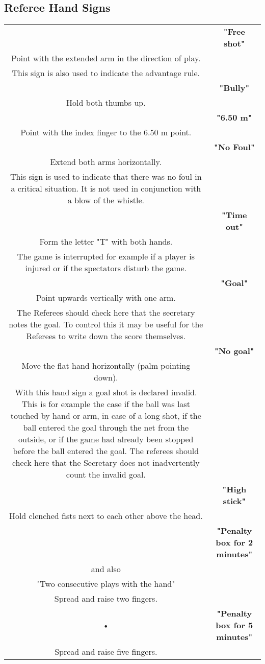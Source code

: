 \subsection{Referee Hand Signs}
\begin{tabular}{|c|c|}
\hline 
 & \textbf{"Free shot"}\\ Point with the extended arm in the direction of play.\\ This sign is also used to indicate the advantage rule. \\ 
\hline 
 & \textbf{"Bully"}\\ Hold both thumbs up. \\ 
\hline 
 & \textbf{"6.50 m"}\\ Point with the index finger to the 6.50 m point. \\ 
\hline 
 & \textbf{"No Foul"}\\Extend both arms horizontally.\\This sign is used to indicate that there was no foul in a critical situation. It is not used in conjunction with a blow of the whistle. \\ 
\hline 
& \textbf{"Time out"}\\Form the letter "T" with both hands.\\The game is interrupted for example if a player is injured or if the spectators disturb the game. \\ 
\hline 
 & \textbf{"Goal"}\\Point upwards vertically with one arm.\\The Referees should check here that the secretary notes the goal. To control this it may be useful for the Referees to write down the score themselves. \\ 
\hline 
 & \textbf{"No goal"}\\
Move the flat hand horizontally (palm pointing down).\\With this hand sign a goal shot is declared invalid. This is for example the
case if the ball was last touched by hand or arm, in case of a long shot, if the ball entered the goal through the net from the outside, or if the game had already been stopped before the ball entered the goal. The referees should check here that the Secretary does not inadvertently count the invalid goal. \\ 
\hline 
 & \textbf{"High stick"}\\
Hold clenched fists next to each other above the head. \\ 
\hline 
 & \textbf{"Penalty box for 2 minutes"}\\and also\\"Two consecutive plays with the hand"\\Spread and raise two fingers. \\ 
\hline 
• & \textbf{"Penalty box for 5 minutes"}\\Spread and raise five fingers. \\ 
\hline 
\end{tabular} 